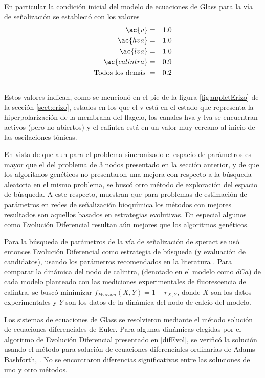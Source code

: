 En particular la condición inicial del modelo de ecuaciones de Glass para la vía de señalización se estableció con los valores
\begin{eqnarray*}
\ac{v} & = & 1.0\\
\ac{hva} & = & 1.0\\
\ac{lva} & = & 1.0\\
\ac{calintra} & = & 0.9\\
\text{Todos los demás } & = & 0.2 
\end{eqnarray*}
\\
Estos valores indican, como se mencionó en el pie de la figura \ref{fig:appletErizo} de la sección \ref{sect:erizo}, estados en los que el \acf{v} está en el estado que representa la hiperpolarización de la membrana del flagelo, los canales \acf{hva} y \acf{lva} se encuentran activos (pero no abiertos) y el \acf{calintra} está en un valor muy cercano al inicio de las oscilaciones tónicas.

En vista de que aun para el problema sincronizado el espacio de parámetros es mayor que el del problema de 3 nodos presentado en la sección anterior, y de que los algoritmos genéticos no presentaron una mejora con respecto a la búsqueda aleatoria en el mismo problema, se buscó otro método de exploración del espacio de búsqueda. A este respecto, \citeauthor{BangaMoles2003} \citep{BangaMoles2003} muestran que para problemas de estimación de parámetros en redes de señalización bioquímica los métodos con mejores resultados son aquellos basados en estrategias evolutivas. En especial algunos como Evolución Diferencial resultan aún mejores que los algoritmos genéticos.

Para la búsqueda de parámetros de la vía de señalización de speract se usó entonces Evolución Diferencial como estrategia de búsqueda (y evaluación de candidatos), usando los parámetros recomendados en la literatura \citeauthor{Storn1997}  \citep{Storn1997}. Para comparar la dinámica del nodo de \ac{calintra}, (denotado en el modelo como $dCa$) de cada modelo planteado con las mediciones experimentales de fluorescencia de \ac{calintra}, se buscó minimizar $f_{Pearson}(X,Y) = 1-r_{X,Y}$, donde $X$ son los datos experimentales y $Y$ son los datos de la dinámica del nodo de calcio del modelo. 

Los sistemas de ecuaciones de Glass se resolvieron mediante el método solución de ecuaciones diferenciales de Euler. Para algunas dinámicas elegidas por el algoritmo de Evolución Diferencial presentado en \ref{difEvol}, se verificó la solución usando el método para solución de ecuaciones diferenciales ordinarias de Adams-Bashforth, \citeauthor{gslManual} \citep{gslManual}. No se encontraron diferencias significativas entre las soluciones de uno y otro métodos.


